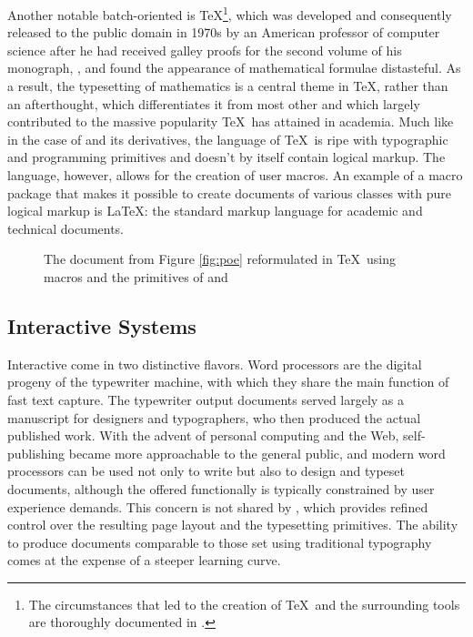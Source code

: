Another notable batch-oriented  is \TeX{}\footnote{
  The circumstances that led to the creation of \TeX\ and the surrounding tools
  are thoroughly documented in .
}, which was developed and consequently released to the public domain in 1970s
by an American professor of computer science  after he had
received galley proofs for the second volume of his monograph, , and found the appearance of mathematical formulae
distasteful. As a result, the typesetting of mathematics is a central theme in
\TeX, rather than an afterthought, which differentiates it from most other
 and which largely contributed to the massive popularity \TeX\ has
attained in academia. Much like in the case of  and its
derivatives, the language of \TeX\ is ripe with typographic and programming
primitives and doesn't by itself contain logical markup. The language, however,
allows for the creation of user macros. An example of a macro package that makes
it possible to create documents of various classes with pure logical markup is
\LaTeX{}: the standard markup language for academic and
technical documents.

\begin{figure}
  \caption{The document from Figure \ref{fig:poe} reformulated in \TeX\ using
     macros and the primitives of  and
    }
\end{figure}

\subsection{Interactive Systems}
Interactive  come in two distinctive flavors. Word processors
 are the digital progeny of the
typewriter machine, with which they share the main function of fast text
capture. The typewriter output documents served largely as a manuscript for
designers and typographers, who then produced the actual published work. With
the advent of personal computing and the Web, self-publishing became more
approachable to the general public, and modern word processors can be used not
only to write but also to design and typeset documents, although the offered
functionally is typically constrained by user experience demands. This concern
is not shared by , which provides
refined control over the resulting page layout and the typesetting primitives.
The ability to produce documents comparable to those set using traditional
typography comes at the expense of a steeper learning curve.

